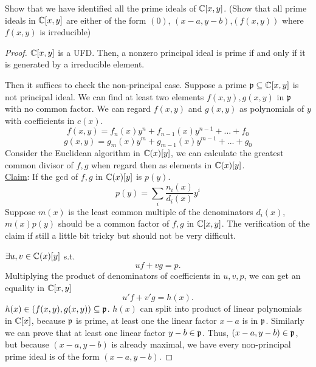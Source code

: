 \documentclass[11pt,fleqn]{book}
\begin{document}
\begin{exr}
Show that we have identified all the prime ideals of $\mathbb C[x,y]$. (Show that all prime ideals in $\mathbb C[x,y]$ are either of the form $(0)$, $(x-a,y-b)$,$(f(x,y))$ where $f(x,y)$ is irreducible)
\end{exr}
\begin{proof} $\mathbb C[x,y]$ is a UFD. Then, a nonzero principal ideal is prime if and only if it is generated by a irreducible element.

Then it suffices to check the  non-principal case. Suppose a prime ${\mathfrak p}\subseteq \mathbb C[x,y]$ is not principal ideal. We can find at least two elements $f(x,y), g(x,y)$ in ${\mathfrak p}$ with no common factor. We can regard $f(x,y)$ and $g(x,y)$ as polynomials of $y$ with coefficients in $c(x)$.
$$
f(x,y)=f_n(x)y^n+f_{n-1}(x)y^{n-1}+...+f_0
$$
$$
g(x,y)=g_m(x)y^m+g_{m-1}(x)y^{m-1}+...+g_0
$$
Consider the Euclidean algorithm in $\mathbb C(x)[y]$, we can calculate the greatest common divisor of $f,g$ when regard then as elements in $\mathbb C(x)[y]$. \\
\underline{Claim}: If the gcd of $f,g$ in $\mathbb C(x)[y]$ is $p(y)$.
$$
p(y)=\sum_i\frac{n_i(x)}{d_i(x)}y^i
$$
 Suppose $m(x)$ is the least common multiple of the denominators $d_i(x)$, $m(x)p(y)$ should be a common factor of $f,g$ in $\mathbb C[x,y]$.
 {\color{red} The verification of the claim if still a little bit tricky but should not be very difficult.}

$\exists u,v\in \mathbb C(x)[y]$ s.t. 
$$
u f+vg=p.
$$
Multiplying the product of denominators of coefficients in $u,v,p$, we can get an equality in $\mathbb C[x,y]$
$$
u'f+v'g=h(x).
$$
$h(x)\in (f(x,y),g(x,y))\subseteq{\mathfrak p}$. $h(x)$ can split into product of linear polynomials in $\mathbb C[x]$, because ${\mathfrak p}$ is prime, at least one the linear factor $x-a$ is in ${\mathfrak p}$. Similarly we can prove that at least one linear factor $y-b\in {\mathfrak p}$. Thus, $(x-a,y-b)\in{\mathfrak p}$, but because $(x-a,y-b)$ is already maximal, we have every non-principal prime ideal is of the form $(x-a,y-b)$.
\end{proof}
\end{document}
